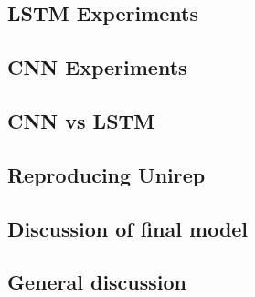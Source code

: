 \subsection{LSTM Experiments}


\subsection{CNN Experiments}


\subsection{CNN vs LSTM}


\subsection{Reproducing Unirep}
\subsection{Discussion of final model}
\subsection{General discussion}
